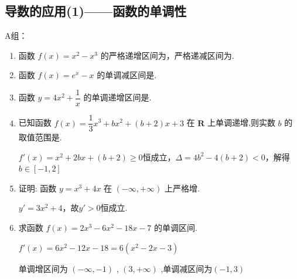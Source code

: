 \clearpage

\subsection*{导数的应用(1)——函数的单调性}
A组：
\begin{enumerate}
    \item 函数 $f\left( x\right)  = {x}^{2} - {x}^{3}$ 的严格递增区间为，严格递减区间为.

    \item 函数 $f\left( x\right)  = {e}^{x} - x$ 的单调减区间是.

    \item 函数 $y = 4{x}^{2} + \dfrac{1}{x}$ 的单调递增区间是.

    \item 已知函数 $f\left( x\right)  = \dfrac{1}{3}{x}^{3} + b{x}^{2} + \left( {b + 2}\right) x + 3$ 在 $\mathbf{R}$ 上单调递增,则实数 $b$ 的取值范围是\blkda{$[-1, 2]$}.
    \begin{jieda}
        $f'(x) = x^2+2bx+(b+2) \geq 0$恒成立，$\Delta = 4b^2 - 4(b+2) < 0$，解得$b \in [-1, 2]$
    \end{jieda}

    \item 证明: 函数 $y = {x}^{3} + {4x}$ 在 $\left( {-\infty , + \infty }\right)$ 上严格增.
    \begin{jieda}
        $y' = 3x^2 + 4$，故$y' > 0$恒成立.
    \end{jieda}

    \item 求函数 $f\left( x\right)  = 2{x}^{3} - 6{x}^{2} - {18x} - 7$ 的单调区间.
    \begin{jieda}
        $f'(x) = 6x^2-12x-18 = 6(x^2-2x-3)$

        单调增区间为 $\left( {-\infty , - 1}\right)$ , $\left( {3, + \infty }\right)$ ,单调减区间为$(-1,3)$
    \end{jieda}
\end{enumerate}


